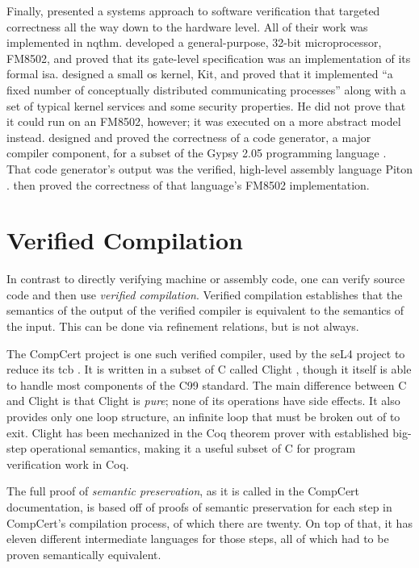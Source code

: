 Finally, \textcite{bevier1989approach} presented a systems approach to software verification
that targeted correctness all the way down to the hardware level.
All of their work was implemented in \ac{nqthm}.
\Textcite{hunt1989microprocessor} developed a general-purpose, 32-bit microprocessor,
FM8502, and proved that its gate-level specification
was an implementation of its formal \ac{isa}.
\Textcite{bevier1989short,bevier1989kit,bevier1987verified}
designed a small \ac{os} kernel, Kit, and proved that it implemented
``a fixed number of conceptually distributed communicating processes''
along with a set of typical kernel services and some security properties.
He did not prove that it could run on an FM8502, however;
it was executed on a more abstract model instead.
\Textcite{young1989generator} designed and proved the correctness of a code generator,
a major compiler component, for a subset of the Gypsy 2.05 programming language
\autocite{good1986gypsy}. That code generator's output was
the verified, high-level assembly language Piton \autocite{moore1988piton}.
\Textcite{moore1989language} then proved the correctness
of that language's FM8502 implementation.

\section{Verified Compilation}\label{se:verified}
In contrast to directly verifying machine or assembly code,
one can verify source code and then use \emph{verified compilation}.%
Verified compilation establishes that
the semantics of the output of the verified compiler
is equivalent to the semantics of the input.
This can be done via refinement relations, but is not always.

The CompCert project is one such verified compiler,
used by the seL4 project to reduce its \ac{tcb} \autocite{Klein_AEMSKH_14}.
It is written in a subset of C
called Clight \autocite{leroy:compcert,blazy2009clight},
though it itself is able to handle most components of the C99 standard.
The main difference between C and Clight is that Clight is \emph{pure};
none of its operations have side effects. It also provides only one loop structure,
an infinite loop that must be broken out of to exit.
Clight has been mechanized in the Coq theorem prover with established
big-step operational semantics, making it a useful subset of C
for program verification work in Coq.

The full proof of \emph{semantic preservation},
as it is called in the CompCert documentation,
is based off of proofs of semantic preservation
for each step in CompCert's compilation process, of which there are twenty.
On top of that, it has eleven different intermediate languages for those steps,
all of which had to be proven semantically equivalent.

